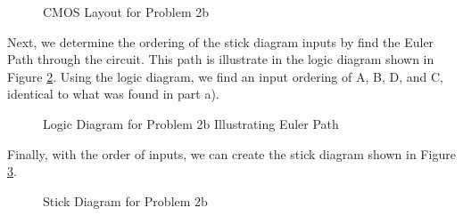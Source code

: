 \documentclass[fleqn]{article}
\begin{document}
\begin{enumerate}
\begin{enumerate}
			\begin{figure}[H]
				\centerline{}
				\caption{CMOS Layout for Problem 2b}
				\label{fig::cmos_layout_problem_2b}
			\end{figure}
			
			Next, we determine the ordering of the stick diagram inputs by find the Euler Path through the circuit. This path is illustrate in the logic diagram shown in Figure \ref{fig::logic_diagram_problem_2b}. Using the logic diagram, we find an input ordering of A, B, D, and C, identical to what was found in part a).
			
			\begin{figure}[H]
				\centerline{}
				\caption{Logic Diagram for Problem 2b Illustrating Euler Path}
				\label{fig::logic_diagram_problem_2b}
			\end{figure}
			
			Finally, with the order of inputs, we can create the stick diagram shown in Figure \ref{fig::stick_diagram_problem_2b}.
			
			\begin{figure}[H]
				\centerline{}
				\caption{Stick Diagram for Problem 2b}
				\label{fig::stick_diagram_problem_2b}
			\end{figure}
		\end{enumerate}
	\end{enumerate}
\end{document}
